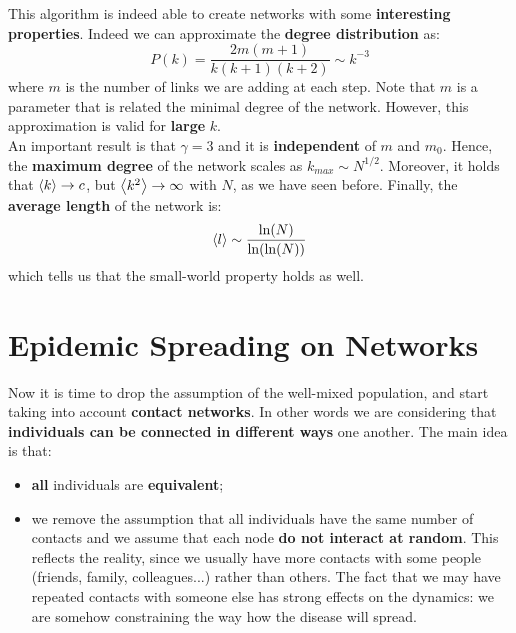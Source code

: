 \documentclass[../main/main.tex]{subfiles}
\begin{document}
This algorithm is indeed able to create networks with some \textbf{interesting properties}. Indeed we can approximate the \textbf{degree distribution} as:
\begin{equation*}
  P(k) = \frac{2 m (m +1)}{k(k+1)(k+2)} \sim k^{-3}
\end{equation*}
where $m$ is the number of links we are adding at each step. Note that $m$ is a parameter that is related the minimal degree of the network. However, this approximation is valid for \textbf{large} \( k \).\\
An important result is that \( \gamma =3  \) and it is \textbf{independent} of \( m \) and \( m_0 \).
Hence, the \textbf{maximum degree} of the network scales as \( k_{max} \sim N^{1/2} \). Moreover, it holds that \( \expval{k} \rightarrow c \), but \( \expval{k^2} \rightarrow \infty   \) with \( N \), as we have seen before.
Finally, the \textbf{average length} of the network is:
\begin{equation*}
  \expval{l} \sim \frac{\ln (N)}{\ln (\ln (N))}
\end{equation*}
which tells us that the small-world property holds as well.










\chapter{Epidemic Spreading on Networks}

Now it is time to drop the assumption of the well-mixed population, and start taking into account \textbf{contact networks}. In other words we are considering that \textbf{individuals can be connected in different ways} one another.
The main idea is that:
\begin{itemize}
\item \textbf{all} individuals are \textbf{equivalent};
\item we remove the assumption that all individuals have the same number of contacts and we assume that each node \textbf{do not interact at random}. This reflects the reality, since we usually have more contacts with some people (friends, family, colleagues...) rather than others. The fact that we may have repeated contacts with someone else has strong effects on the dynamics: we are somehow constraining the way how the disease will spread.
\end{itemize}
\end{document}

